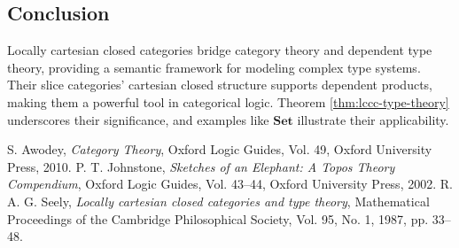 \documentclass{article}
\begin{document}
\subsection{Conclusion}

Locally cartesian closed categories bridge category theory and dependent type theory, providing a semantic framework for modeling complex type systems. Their slice categories’ cartesian closed structure supports dependent products, making them a powerful tool in categorical logic. Theorem \ref{thm:lccc-type-theory} underscores their significance, and examples like $\mathbf{Set}$ illustrate their applicability.

\begin{thebibliography}{9}

 S. Awodey, \emph{Category Theory}, Oxford Logic Guides, Vol. 49, Oxford University Press, 2010.
 P. T. Johnstone, \emph{Sketches of an Elephant: A Topos Theory Compendium}, Oxford Logic Guides, Vol. 43–44, Oxford University Press, 2002.
 R. A. G. Seely, \emph{Locally cartesian closed categories and type theory}, Mathematical Proceedings of the Cambridge Philosophical Society, Vol. 95, No. 1, 1987, pp. 33--48.

\end{thebibliography}
\end{document}
